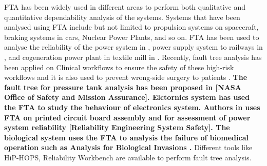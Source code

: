 \documentclass[10pt]{llncs}
\begin{document}
			
%

FTA has been widely used in different areas to perform both qualitative and quantitative dependability analysis of the systems. Systems that have been analysed using FTA include but not limited to propulsion systems on spacecraft, braking systems in cars, Nuclear Power Plants, and so on. FTA has been used to analyse the reliability of the power system in  \cite{volkanovski2009,cepin2011assessment}, power supply system to railways in  \cite{Chen2007}, and cogeneration power plant in textile mill in \cite{Ramesh2011}.  Recently, fault tree analysis has been applied on Clinical workflows to ensure the safety of these high-risk workflows \cite{lamis2014} and it is also used to prevent wrong-side surgery to patients \cite{abecassis2015}. \textbf{The fault tree for pressure tank analysis has been proposed in [NASA Office of Safety and Mission Assurance].
Elctornics system has used the FTA to study the behaviour of electronics system. Authors in \cite{shu2006using} uses FTA on printed circuit board assembly and 
for assessment of power system reliability [Reliability Engineering  System Safety]. The biological system uses the FTA to analysis the failure of biomedical operation such as Analysis for Biological Invasions  \cite{hayes2002identifying}.} Different tools like HiP-HOPS\cite{Papadopoulos2012}, Reliability Workbench\cite{Isograph2014}  are available to perform fault tree analysis.
 
\end{document}
